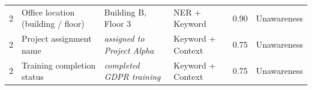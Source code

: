 \documentclass[12pt, a4paper]{report}
\begin{document}
\begin{longtable}{
    C{0.8cm}
    L{3.0cm}
    L{3.2cm}
    L{2.8cm}
    C{0.8cm}
    L{2.5cm}
  }
  \small 2 & \small Office location (building / floor) &
  \small Building B, Floor 3 & \small NER + Keyword &
  \small 0.90 & \small Unawareness \\

  \small 2 & \small Project assignment name &
  \small \textit{assigned to Project Alpha} & \small Keyword + Context &
  \small 0.75 & \small Unawareness \\

  \small 2 & \small Training completion status &
  \small \textit{completed GDPR training} & \small Keyword + Context &
  \small 0.75 & \small Unawareness \\

  \bottomrule
\end{longtable}

\clearpage
\setcounter{section}{0}

\end{document}
